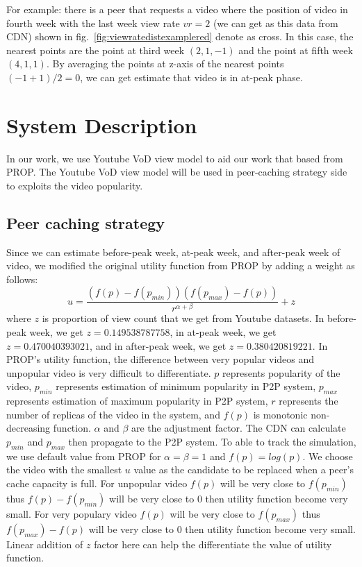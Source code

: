 For example: there is a peer that requests a video where the position of video in fourth week with the last week view rate $vr=2$ (we can get as this data from CDN) shown in fig.~\ref{fig:viewratedistexamplered} denote as cross.
In this case, the nearest points are the point at third week $(2,1,-1)$ and the point at fifth week $(4,1,1)$.  
By averaging the points at z-axis of the nearest points $(-1 + 1)/2 = 0$,  we can get estimate that video is in at-peak phase.

\section{System Description}\label{systemdescription}
In our work, we use Youtube VoD view model to aid our work that based from PROP. 
The Youtube VoD view model will be used in peer-caching strategy side to exploits the video popularity. 

\subsection{Peer caching strategy}\label{peercachingstrategy}
Since we can estimate before-peak week, at-peak week, and after-peak week of video, we modified the original utility function from PROP by adding a weight as follows:
\begin{equation}
u = \frac{ (f(p) - f(p_{min})) (f(p_{max}) - f(p)) }{r^{\alpha + \beta}} + z
\end{equation}
where $z$ is proportion of view count that we get from Youtube datasets.  
In before-peak week, we get $z=0.149538787758 $,  in at-peak week, we get $z=0.470040393021$, and in after-peak week, we get $z=0.380420819221$.
In PROP's utility function, the difference between very popular videos and unpopular video is very difficult to differentiate. 
$p$ represents popularity of the video, $p_{min}$ represents estimation of minimum popularity in P2P system, $p_{max}$ represents estimation of maximum popularity in P2P system, $r$ represents the number of replicas of the video in the system, and $f(p)$ is monotonic non-decreasing function.
$\alpha$ and $\beta$ are the adjustment factor.
The CDN can calculate $p_{min}$ and $p_{max}$ then propagate to the P2P system.
To able to track the simulation, we use default value from PROP for $\alpha=\beta=1$ and $f(p)=log (p)$.
We choose the video with the smallest $u$ value as the candidate to be replaced when a peer's cache capacity is full.
For unpopular video $f(p)$ will be very close to $f(p_{min})$ thus $f(p) - f(p_{min})$ will be very close to $0$ then utility function become very small.
For very populary video $f(p)$ will be very close to $f(p_{max})$ thus $f(p_{max}) - f(p)$ will be very close to $0$ then utility function become very small.  
Linear addition of $z$ factor here can help the differentiate the value of utility function.

